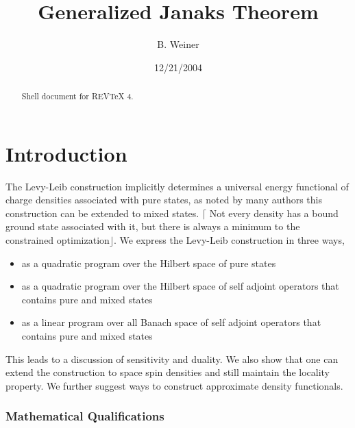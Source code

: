 \documentclass[aps,preprint]{revtex4}%
\begin{document}
\preprint{ }
\title[Janaks Theorem]{Generalized Janaks Theorem}
\author{B. Weiner}

\begin{abstract}
Shell document for REV\TeX{} 4.

\end{abstract}
\date{12/21/2004}
\maketitle
\tableofcontents


\section{Introduction\label{Intro}}

The Levy-Leib construction implicitly determines a universal energy functional
of charge densities associated with pure states, as noted by many authors this
construction can be extended to mixed states. $\lceil$ Not every density has a
bound ground state associated with it, but there is always a minimum to the
constrained optimization$\rfloor$. We express the Levy-Leib construction in
three ways,

\begin{itemize}
\item as a quadratic program over the Hilbert space of pure states

\item as a quadratic program over the Hilbert space of self adjoint operators
that contains pure and mixed states

\item as a linear program over all Banach space of self adjoint operators that
contains pure and mixed states
\end{itemize}

This leads to a discussion of sensitivity and duality. We also show that one
can extend the construction to space spin densities and still maintain the
locality property. We further suggest ways to construct approximate density functionals.

\subsubsection{Mathematical Qualifications}
\end{document}

